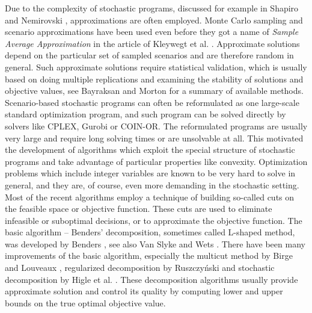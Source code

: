 \documentclass{article}              %
\begin{document}
Due to the complexity of stochastic programs,  discussed for example in Shapiro and Nemirovski \cite{complexity}, approximations are often employed. Monte Carlo sampling and scenario approximations have been used even before they got a name of \emph{Sample Average Approximation} in the article of Kleywegt et al. \cite{saa}. Approximate solutions depend on the particular set of sampled scenarios and are therefore random in general. Such approximate solutions require statistical validation, which is usually based on doing multiple replications and examining the stability of solutions and objective values, see Bayraksan and Morton \cite{bayraksan_morton_2011} for a summary of available methods. Scenario-based stochastic programs can often be reformulated as one large-scale standard optimization program, and such program can be solved directly by solvers like CPLEX, Gurobi or COIN-OR. The reformulated programs are usually very large and require long solving times or are unsolvable at all. This motivated the development of algorithms which exploit the special structure of stochastic programs and take advantage of particular properties like convexity. Optimization problems which include integer variables are known to be very hard to solve in general, and they are, of course, even more demanding in the stochastic setting. Most of the recent algorithms employ a technique of building so-called cuts on the feasible space or objective function. These cuts are used to eliminate infeasible or suboptimal decisions, or to approximate the objective function. The basic algorithm -- Benders' decomposition, sometimes called L-shaped method, was developed by Benders \cite{benders}, see also Van Slyke and Wets \cite{slyke_wets}. There have been many improvements of the basic algorithm, especially the multicut method by Birge and Louveaux \cite{birge_multicut}, regularized decomposition by Ruszczy{\'n}ski \cite{regular_decomp} and stochastic decomposition by Higle et al. \cite{stochdecomp_2stage}. These decomposition algorithms usually provide approximate solution and control its quality by computing lower and upper bounds on the true optimal objective value.
\end{document}
